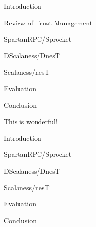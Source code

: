
\newcommand{\cedge}[1]{\stackrel{#1}{\longleftarrow}}
\newcommand{\cred}[3]{\mathit{#1} \cedge{#3} \mathit{#2}}
\newcommand{\datalog}{\text{Datalog}}
\newcommand\T{\rule{0pt}{2.1ex}}

\begin{cenumerate}
\item Introduction
\item Review of Trust Management
\item SpartanRPC/Sprocket
\item DScalaness/DnesT
\item Scalaness/nesT
\item Evaluation
\item Conclusion
\end{cenumerate}
\stopslide


This is wonderful!
\stopslide


\begin{cenumerate}
\item Introduction
\item {}
\item SpartanRPC/Sprocket
\item DScalaness/DnesT
\item Scalaness/nesT
\item Evaluation
\item Conclusion
\end{cenumerate}
\stopslide



